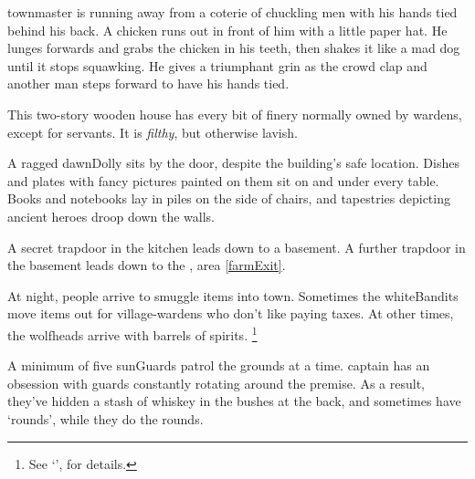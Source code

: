 \begin{multicols}{2}
\begin{boxtext}
  \Gls{townmaster} is running away from a coterie of chuckling men with his hands tied behind his back.
   A chicken runs out in front of him with a little paper hat.
   He lunges forwards and grabs the chicken in his teeth, then shakes it like a mad dog until it stops squawking.
   He gives a triumphant grin as the crowd clap and another man steps forward to have his hands tied.
\end{boxtext}


This two-story wooden house has every bit of finery normally owned by \glspl{warden}, except for servants.
It is \emph{filthy}, but otherwise lavish.

\begin{boxtext}
  A ragged \gls{dawnDolly} sits by the door, despite the building's safe location.
  Dishes and plates with fancy pictures painted on them sit on and under every table.
  Books and notebooks lay in piles on the side of chairs, and tapestries depicting ancient heroes droop down the walls.
\end{boxtext}

A secret trapdoor in the kitchen leads down to a basement.
A further trapdoor in the basement leads down to the , area \vref{farmExit}.

At night, people arrive to smuggle items into \gls{town}.
Sometimes the \gls{whiteBandits} move items out for \gls{village}-\glspl{warden} who don't like paying taxes.
At other times, the \glspl{wolfhead} arrive with barrels of spirits.%
\footnote{See `',  for details.}



A minimum of five \glspl{sunGuard} patrol the grounds at a time.
\Gls{captain} has an obsession with guards constantly rotating around the premise.
As a result, they've hidden a stash of whiskey in the bushes at the back, and sometimes have `rounds', while they do the rounds.


\end{multicols}
